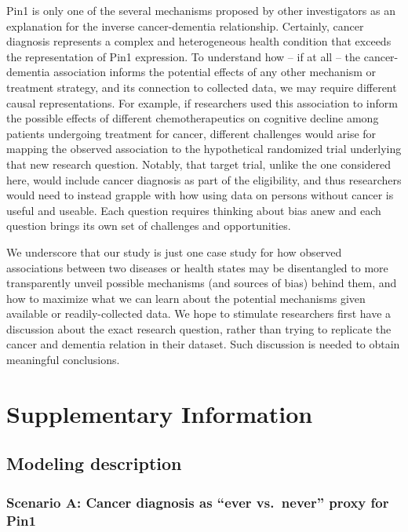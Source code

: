 \documentclass[
]{book}
\begin{document}
Pin1 is only one of the several mechanisms proposed by other investigators as an explanation for the inverse cancer-dementia relationship. Certainly, cancer diagnosis represents a complex and heterogeneous health condition that exceeds the representation of Pin1 expression. To understand how -- if at all -- the cancer-dementia association informs the potential effects of any other mechanism or treatment strategy, and its connection to collected data, we may require different causal representations. For example, if researchers used this association to inform the possible effects of different chemotherapeutics on cognitive decline among patients undergoing treatment for cancer, different challenges would arise for mapping the observed association to the hypothetical randomized trial underlying that new research question. Notably, that target trial, unlike the one considered here, would include cancer diagnosis as part of the eligibility, and thus researchers would need to instead grapple with how using data on persons without cancer is useful and useable\autocite{huitfeldt2016}.
Each question requires thinking about bias anew and each question brings its own set of challenges and opportunities.

We underscore that our study is just one case study for how observed associations between two diseases or health states may be disentangled to more transparently unveil possible mechanisms (and sources of bias) behind them, and how to maximize what we can learn about the potential mechanisms given available or readily-collected data. We hope to stimulate researchers first have a discussion about the exact research question, rather than trying to replicate the cancer and dementia relation in their dataset. Such discussion is needed to obtain meaningful conclusions.

\newpage

\hypertarget{supplementary-information-2}{%
\section{Supplementary Information}\label{supplementary-information-2}}

\hypertarget{modeling-description}{%
\subsection{Modeling description}\label{modeling-description}}

\hypertarget{scenario-a-cancer-diagnosis-as-ever-vs.-never-proxy-for-pin1}{%
\subsubsection{Scenario A: Cancer diagnosis as ``ever vs.~never'' proxy for Pin1}\label{scenario-a-cancer-diagnosis-as-ever-vs.-never-proxy-for-pin1}}
\end{document}

